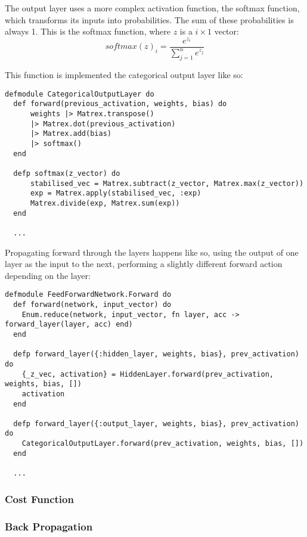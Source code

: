 The output layer uses a more complex activation function, the softmax function,
which transforms its inputs into probabilities. The sum of these probabilities
is always 1. This is the softmax function, where \(z\) is a \(i \times 1\)
vector:
\begin{equation}
    softmax(z)_{i} = \frac{e^{z_{i}}}{\sum_{j=1}^{n} e^{z_{j}}}
\end{equation}

This function is implemented the categorical output layer like so:
\begin{lstlisting}
defmodule CategoricalOutputLayer do
  def forward(previous_activation, weights, bias) do
      weights |> Matrex.transpose()
      |> Matrex.dot(previous_activation)
      |> Matrex.add(bias)
      |> softmax()
  end

  defp softmax(z_vector) do
      stabilised_vec = Matrex.subtract(z_vector, Matrex.max(z_vector))
      exp = Matrex.apply(stabilised_vec, :exp)
      Matrex.divide(exp, Matrex.sum(exp))
  end

  ...
\end{lstlisting}

Propagating forward through the layers happens like so, using the output of one
layer as the input to the next, performing a slightly different forward action
depending on the layer:
\begin{lstlisting}
defmodule FeedForwardNetwork.Forward do
  def forward(network, input_vector) do
    Enum.reduce(network, input_vector, fn layer, acc -> forward_layer(layer, acc) end)
  end

  defp forward_layer({:hidden_layer, weights, bias}, prev_activation) do
    {_z_vec, activation} = HiddenLayer.forward(prev_activation, weights, bias, [])
    activation
  end

  defp forward_layer({:output_layer, weights, bias}, prev_activation) do
    CategoricalOutputLayer.forward(prev_activation, weights, bias, [])
  end

  ...
\end{lstlisting}


\subsubsection{Cost Function}




\subsubsection{Back Propagation}




